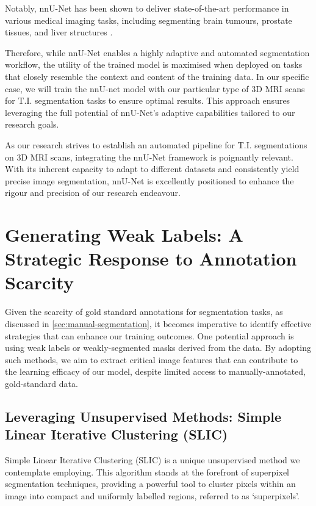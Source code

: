 Notably, nnU-Net has been shown to deliver state-of-the-art performance in various medical imaging tasks, including segmenting brain tumours, prostate tissues, and liver structures \cite{isensee2019nnu}.

Therefore, while nnU-Net enables a highly adaptive and automated segmentation workflow, the utility of the trained model is maximised when deployed on tasks that closely resemble the context and content of the training data. In our specific case, we will train the nnU-net model with our particular type of 3D MRI scans for T.I. segmentation tasks to ensure optimal results. This approach ensures leveraging the full potential of nnU-Net's adaptive capabilities tailored to our research goals.

As our research strives to establish an automated pipeline for T.I. segmentations on 3D MRI scans, integrating the nnU-Net framework is poignantly relevant. With its inherent capacity to adapt to different datasets and consistently yield precise image segmentation, nnU-Net is excellently positioned to enhance the rigour and precision of our research endeavour.

\section{Generating Weak Labels: A Strategic Response to Annotation Scarcity}

Given the scarcity of gold standard annotations for segmentation tasks, as discussed in \autoref{sec:manual-segmentation}, it becomes imperative to identify effective strategies that can enhance our training outcomes. One potential approach is using weak labels or weakly-segmented masks derived from the data. By adopting such methods, we aim to extract critical image features that can contribute to the learning efficacy of our model, despite limited access to manually-annotated, gold-standard data.

\subsection{Leveraging Unsupervised Methods: Simple Linear Iterative Clustering (SLIC)}

Simple Linear Iterative Clustering (SLIC) \cite{achanta2010slic} is a unique unsupervised method we contemplate employing. This algorithm stands at the forefront of superpixel segmentation techniques, providing a powerful tool to cluster pixels within an image into compact and uniformly labelled regions, referred to as `superpixels'.

